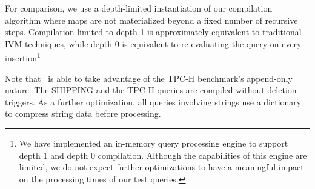 For comparison, we use a depth-limited instantiation of our compilation algorithm where maps are not materialized beyond a fixed number of recursive steps.  Compilation limited to depth 1 is approximately equivalent to traditional IVM techniques, while depth 0 is equivalent to re-evaluating the query on every insertion\footnote{We have implemented an in-memory query processing engine to support depth 1 and depth 0 compilation.  Although the capabilities of this engine are limited, we do not expect further optimizations  to have a meaningful impact on the processing times of our test queries.}

Note that \dbtoaster\ is able to take advantage of the TPC-H benchmark's append-only nature: The SHIPPING and the TPC-H queries are compiled without deletion triggers.  As a further optimization, all queries involving strings use a dictionary to compress string data before processing.

